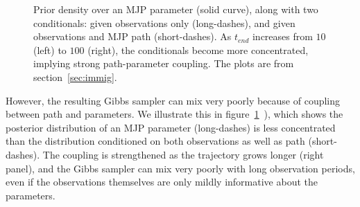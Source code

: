 \begin{figure}
\begin{minipage}[!hp]{0.3\linewidth}
    \vspace{-0 in}
  \end{minipage}
  \vspace{-.3in}
  \caption{Prior density over an MJP parameter (solid curve), along with two conditionals: given observations only (long-dashes), and given observations and MJP path (short-dashes). 
    As $t_{end}$ increases from $10$ (left) to $100$ (right), the conditionals become more concentrated, implying strong path-parameter coupling. 
  The plots are from section~\ref{sec:immig}.}
     \label{fig:hist}
  \end{figure}
  However, the resulting Gibbs sampler can mix very poorly because of coupling between path and parameters.
  We illustrate this in figure~\ref{fig:hist}~\citep[inspired by][]{papaspiliopoulos2007general}), which shows the posterior distribution of an MJP parameter (long-dashes) is less concentrated than the distribution conditioned on both observations as well as path (short-dashes). 
  The coupling is strengthened as the trajectory grows longer (right panel), and the Gibbs sampler can mix very poorly with long observation periods, even if the observations themselves are only mildly informative about the parameters.

